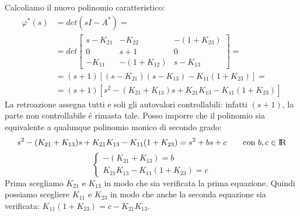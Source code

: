 \begin{Exercise}[title={Studio completo del sistema e stabilizzazione}, difficulty=3]
			Calcoliamo il nuovo polinomio caratteristico:
			\begin{align*}
				\varphi^{*}(s) &= det(sI-A^{*}) =\\
				&= det
				\begin{bmatrix}
					s-K_{21} & -K_{22} & -(1+K_{23})\\
					0 & s+1 & 0\\
					-K_{11} & -(1+K_{12}) & s-K_{13}
				\end{bmatrix} =\\
				&= (s+1)\left[ (s-K_{21})(s-K_{13}) - K_{11}(1+K_{23}) \right] =\\ 
				&= (s+1)\left[ s^2 - (K_{21}+K_{13})s + K_{21}K_{13} - K_{11}(1+K_{23}) \right]
			\end{align*}
			La retroazione assegna tutti e soli gli autovalori controllabili: infatti $ (s+1) $, la parte non controllabile \'e rimasta tale. Posso imporre che il polinomio sia equivalente a qualunque polinomio monico di secondo grado:
			\[ s^2 - (K_{21}+K_{13})s + K_{21}K_{13} - K_{11}(1+K_{23}) = s^2 + bs + c \qquad \text{con}\ b,c \in \rm I\!R \]
			\[
				\begin{cases}
					-(K_{21} + K_{13}) = b\\
					K_{21} K_{13} - K_{11}(1+K_{23}) = c
				\end{cases}
			\]
			Prima scegliamo $ K_{21} $ e $ K_{13} $ in modo che sia verificata la prima equazione. Quindi possiamo scegliere $ K_{11} $ e $ K_{23} $ in modo che anche la seconda equazione sia verificata: $ K_{11}(1+K_{23}) = c - K_{21}K_{13} $.
	\end{Exercise}
